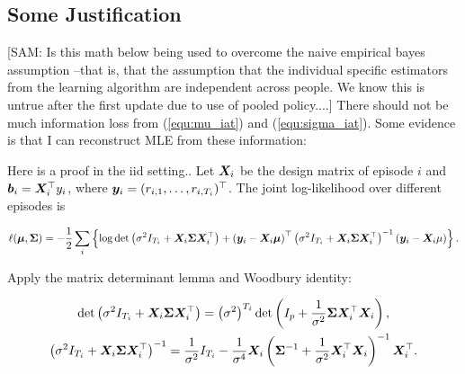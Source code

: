 \documentclass{article}
\newcommand{\sam}[1]{
  {\color{blue} [SAM: {#1}]}
 }
\def\post{{\texttt{post}}}
\begin{document}


\subsection{Some Justification}

\sam{Is this math below being used to overcome the naive empirical bayes assumption --that is, that the assumption that the individual specific estimators from the learning algorithm are  independent across people.  We know this is untrue after the first update due to use of pooled policy....}  There should not be much information loss from (\ref{equ:mu_iat}) and (\ref{equ:sigma_iat}). Some evidence is that I can reconstruct MLE from these information:

Here is a proof in the iid setting.. Let ${\bm{X}}_i$ be the design matrix of episode $i$ and ${\bm{b}}_i = {\bm{X}}_i^{\top} y_i$, where ${\bm{y}}_i = (r_{i, 1}, \dots, r_{i, T_i})^{\top}$. The joint log-likelihood over different episodes is 

\begin{equation}
    \ell({\bm{\mu}}, {\bm{\Sigma}})=-\frac{1}{2} \sum_i\left\{\log \operatorname{det}\left(\sigma^2 I_{T_i}+{\bm{X}}_i {\bm{\Sigma}} {\bm{X}}_i^{\top}\right)+\left({\bm{y}}_i-{\bm{X}}_i {\bm{\mu}}\right)^{\top}\left(\sigma^2 I_{T_i}+{\bm{X}}_i {\bm{\Sigma}} {\bm{X}}_i^{\top}\right)^{-1}\left({\bm{y}}_i-{\bm{X}}_i \mu\right)\right\}.
\end{equation}

Apply the matrix determinant lemma and Woodbury identity:

$$
\begin{gathered}
\operatorname{det}\left(\sigma^2 I_{T_i}+{\bm{X}}_i {\bm{\Sigma}} {\bm{X}}_i^{\top}\right)=\left(\sigma^2\right)^{T_i} \operatorname{det}\left(I_p+\frac{1}{\sigma^2} {\bm{\Sigma}} {\bm{X}}_i^{\top} {\bm{X}}_i\right), \\
\left(\sigma^2 I_{T_i}+{\bm{X}}_i {\bm{\Sigma}} {\bm{X}}_i^{\top}\right)^{-1}=\frac{1}{\sigma^2} I_{T_i}-\frac{1}{\sigma^4} {\bm{X}}_i\left({\bm{\Sigma}}^{-1}+\frac{1}{\sigma^2} {\bm{X}}_i^{\top} {\bm{X}}_i\right)^{-1} {\bm{X}}_i^{\top} .
\end{gathered}
$$
\end{document}
